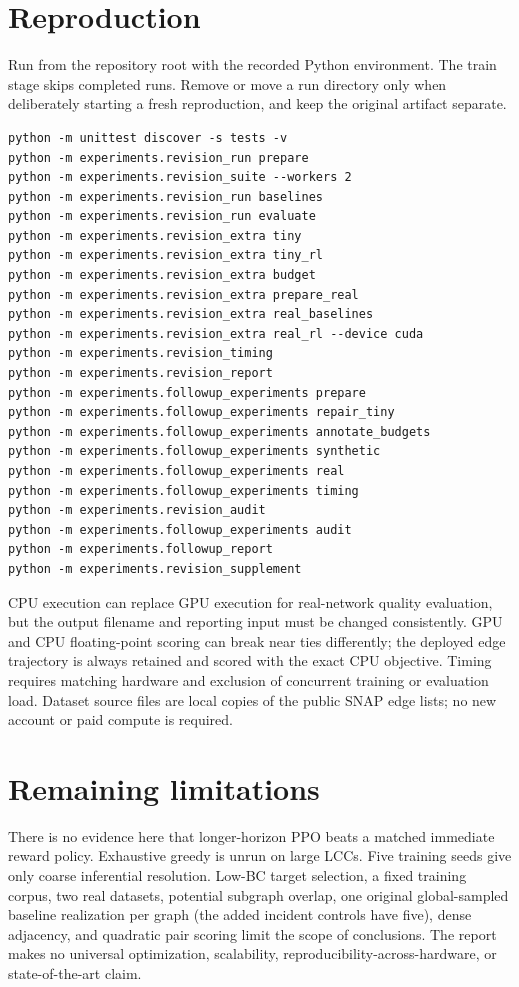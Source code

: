 \documentclass[11pt]{article}
\begin{document}
\section{Reproduction}
Run from the repository root with the recorded Python environment. The train
stage skips completed runs. Remove or move a run directory only when deliberately
starting a fresh reproduction, and keep the original artifact separate.
\begin{Verbatim}[fontsize=\small]
python -m unittest discover -s tests -v
python -m experiments.revision_run prepare
python -m experiments.revision_suite --workers 2
python -m experiments.revision_run baselines
python -m experiments.revision_run evaluate
python -m experiments.revision_extra tiny
python -m experiments.revision_extra tiny_rl
python -m experiments.revision_extra budget
python -m experiments.revision_extra prepare_real
python -m experiments.revision_extra real_baselines
python -m experiments.revision_extra real_rl --device cuda
python -m experiments.revision_timing
python -m experiments.revision_report
python -m experiments.followup_experiments prepare
python -m experiments.followup_experiments repair_tiny
python -m experiments.followup_experiments annotate_budgets
python -m experiments.followup_experiments synthetic
python -m experiments.followup_experiments real
python -m experiments.followup_experiments timing
python -m experiments.revision_audit
python -m experiments.followup_experiments audit
python -m experiments.followup_report
python -m experiments.revision_supplement
\end{Verbatim}
CPU execution can replace GPU execution for real-network quality evaluation,
but the output filename and reporting input must be changed consistently.
GPU and CPU floating-point scoring can break near ties differently; the
deployed edge trajectory is always retained and scored with the exact CPU
objective. Timing requires matching hardware and exclusion of concurrent
training or evaluation load. Dataset source files are local copies of the
public SNAP edge lists; no new account or paid compute is required.


\section{Remaining limitations}
There is no evidence here that longer-horizon PPO beats a matched immediate
reward policy. Exhaustive greedy is unrun on large LCCs. Five training seeds
give only coarse inferential resolution. Low-BC target selection, a fixed
training corpus, two real datasets, potential subgraph overlap, one original global-sampled
baseline realization per graph (the added incident controls have five), dense adjacency, and quadratic pair scoring
limit the scope of conclusions. The report makes no universal optimization,
scalability, reproducibility-across-hardware, or state-of-the-art claim.
\end{document}
